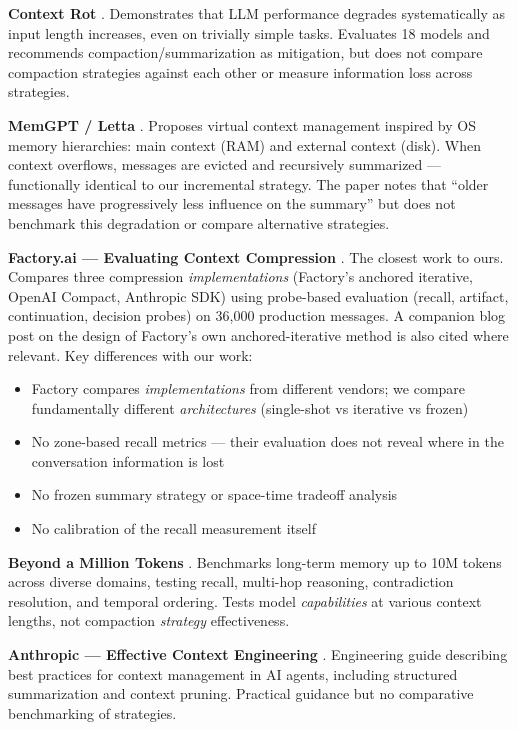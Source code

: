 \textbf{Context Rot} \citep{chroma2025contextrot}. Demonstrates that LLM performance
degrades systematically as input length increases, even on trivially simple
tasks. Evaluates 18 models and recommends compaction/summarization as
mitigation, but does not compare compaction strategies against each other
or measure information loss across strategies.

\textbf{MemGPT / Letta} \citep{packer2023memgpt}. Proposes virtual context management
inspired by OS memory hierarchies: main context (RAM) and external context
(disk). When context overflows, messages are evicted and recursively
summarized --- functionally identical to our incremental strategy. The paper
notes that ``older messages have progressively less influence on the summary''
but does not benchmark this degradation or compare alternative strategies.

\textbf{Factory.ai --- Evaluating Context Compression} \citep{factory2025evaluating}. The closest
work to ours. Compares three compression \textit{implementations} (Factory's
anchored iterative, OpenAI Compact, Anthropic SDK) using probe-based
evaluation (recall, artifact, continuation, decision probes) on 36{,}000
production messages. A companion blog post on the design of Factory's own
anchored-iterative method \citep{factory2025compressing} is also cited where relevant. Key
differences with our work:
\begin{itemize}
  \item Factory compares \textit{implementations} from different vendors; we compare
    fundamentally different \textit{architectures} (single-shot vs iterative vs frozen)
  \item No zone-based recall metrics --- their evaluation does not reveal where
    in the conversation information is lost
  \item No frozen summary strategy or space-time tradeoff analysis
  \item No calibration of the recall measurement itself
\end{itemize}

\textbf{Beyond a Million Tokens} \citep{tavakoli2025beyondmillion}. Benchmarks long-term memory up to 10M
tokens across diverse domains, testing recall, multi-hop reasoning,
contradiction resolution, and temporal ordering. Tests model \textit{capabilities}
at various context lengths, not compaction \textit{strategy} effectiveness.

\textbf{Anthropic --- Effective Context Engineering} \citep{anthropic2025context}. Engineering guide
describing best practices for context management in AI agents, including
structured summarization and context pruning. Practical guidance but no
comparative benchmarking of strategies.

